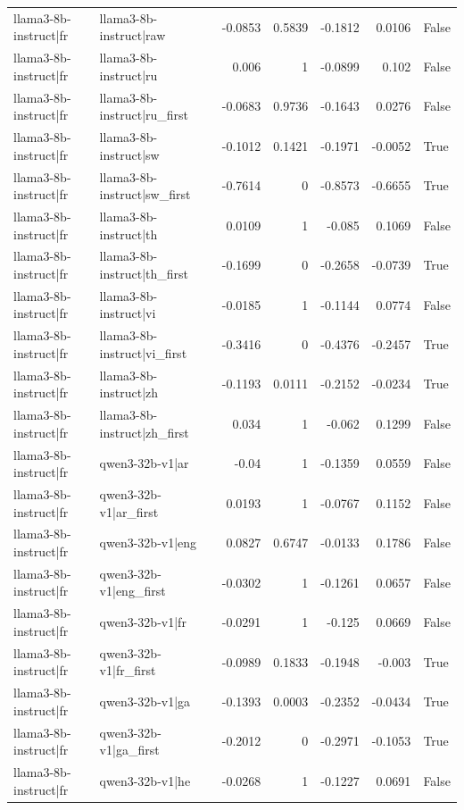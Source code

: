 \begin{table}
\begin{tabular}{l l r r r r l}
llama3-8b-instruct|fr & llama3-8b-instruct|raw & -0.0853 & 0.5839 & -0.1812 & 0.0106 & False \\
llama3-8b-instruct|fr & llama3-8b-instruct|ru & 0.006 & 1 & -0.0899 & 0.102 & False \\
llama3-8b-instruct|fr & llama3-8b-instruct|ru_first & -0.0683 & 0.9736 & -0.1643 & 0.0276 & False \\
llama3-8b-instruct|fr & llama3-8b-instruct|sw & -0.1012 & 0.1421 & -0.1971 & -0.0052 & True \\
llama3-8b-instruct|fr & llama3-8b-instruct|sw_first & -0.7614 & 0 & -0.8573 & -0.6655 & True \\
llama3-8b-instruct|fr & llama3-8b-instruct|th & 0.0109 & 1 & -0.085 & 0.1069 & False \\
llama3-8b-instruct|fr & llama3-8b-instruct|th_first & -0.1699 & 0 & -0.2658 & -0.0739 & True \\
llama3-8b-instruct|fr & llama3-8b-instruct|vi & -0.0185 & 1 & -0.1144 & 0.0774 & False \\
llama3-8b-instruct|fr & llama3-8b-instruct|vi_first & -0.3416 & 0 & -0.4376 & -0.2457 & True \\
llama3-8b-instruct|fr & llama3-8b-instruct|zh & -0.1193 & 0.0111 & -0.2152 & -0.0234 & True \\
llama3-8b-instruct|fr & llama3-8b-instruct|zh_first & 0.034 & 1 & -0.062 & 0.1299 & False \\
llama3-8b-instruct|fr & qwen3-32b-v1|ar & -0.04 & 1 & -0.1359 & 0.0559 & False \\
llama3-8b-instruct|fr & qwen3-32b-v1|ar_first & 0.0193 & 1 & -0.0767 & 0.1152 & False \\
llama3-8b-instruct|fr & qwen3-32b-v1|eng & 0.0827 & 0.6747 & -0.0133 & 0.1786 & False \\
llama3-8b-instruct|fr & qwen3-32b-v1|eng_first & -0.0302 & 1 & -0.1261 & 0.0657 & False \\
llama3-8b-instruct|fr & qwen3-32b-v1|fr & -0.0291 & 1 & -0.125 & 0.0669 & False \\
llama3-8b-instruct|fr & qwen3-32b-v1|fr_first & -0.0989 & 0.1833 & -0.1948 & -0.003 & True \\
llama3-8b-instruct|fr & qwen3-32b-v1|ga & -0.1393 & 0.0003 & -0.2352 & -0.0434 & True \\
llama3-8b-instruct|fr & qwen3-32b-v1|ga_first & -0.2012 & 0 & -0.2971 & -0.1053 & True \\
llama3-8b-instruct|fr & qwen3-32b-v1|he & -0.0268 & 1 & -0.1227 & 0.0691 & False \\

\end{tabular}
\end{table}
